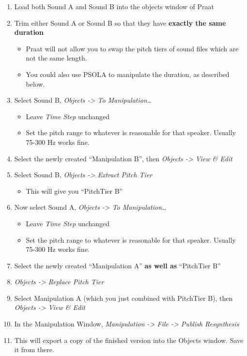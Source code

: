 \begin{enumerate}
\def\labelenumi{\arabic{enumi}.}
\tightlist
\item
  Load both Sound A and Sound B into the objects window of Praat
\item
  Trim either Sound A or Sound B so that they have \textbf{exactly the
  same duration}

  \begin{itemize}
  \tightlist
  \item
    Praat will not allow you to swap the pitch tiers of sound files
    which are not the same length.
  \item
    You could also use PSOLA to manipulate the duration, as described
    below.
  \end{itemize}
\item
  Select Sound B, \emph{Objects -\textgreater{} To Manipulation\ldots{}}

  \begin{itemize}
  \tightlist
  \item
    Leave \emph{Time Step} unchanged
  \item
    Set the pitch range to whatever is reasonable for that speaker.
    Usually 75-300 Hz works fine.
  \end{itemize}
\item
  Select the newly created ``Manipulation B'', then \emph{Objects
  -\textgreater{} View \& Edit}
\item
  Select Sound B, \emph{Objects -\textgreater{} Extract Pitch Tier}

  \begin{itemize}
  \tightlist
  \item
    This will give you ``PitchTier B''
  \end{itemize}
\item
  Now select Sound A, \emph{Objects -\textgreater{} To
  Manipulation\ldots{}}

  \begin{itemize}
  \tightlist
  \item
    Leave \emph{Time Step} unchanged
  \item
    Set the pitch range to whatever is reasonable for that speaker.
    Usually 75-300 Hz works fine.
  \end{itemize}
\item
  Select the newly created ``Manipulation A'' \textbf{as well as}
  ``PitchTier B''
\item
  \emph{Objects -\textgreater{} Replace Pitch Tier}
\item
  Select Manipulation A (which you just combined with PitchTier B), then
  \emph{Objects -\textgreater{} View \& Edit}
\item
  In the Manipulation Window, \emph{Manipulation -\textgreater{} File
  -\textgreater{} Publish Resynthesis}
\item
  This will export a copy of the finished version into the Objects
  window. Save it from there.
\end{enumerate}

